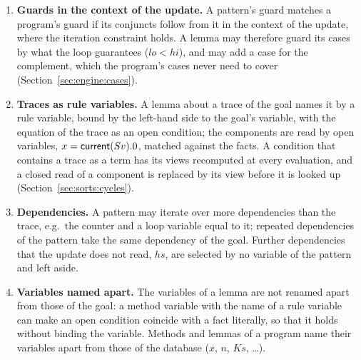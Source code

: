 \begin{enumerate}[nosep]
  the left-hand side by equations (Section~\ref{sec:sorts:selection}). A quantified hypothesis is never matched; the
  specification provides an atom for it.
\item \textbf{Guards in the context of the update.} A pattern's guard matches a program's guard if its conjuncts follow
  from it in the context of the update, where the iteration constraint holds. A lemma may therefore guard its cases by
  what the loop guarantees ($lo < hi$), and may add a case for the complement, which the program's cases never need to
  cover (Section~\ref{sec:engine:cases}).
\item \textbf{Traces as rule variables.} A lemma about a trace of the goal names it by a rule variable, bound by the
  left-hand side to the goal's variable, with the equation of the trace as an open condition; the components are read
  by open variables, $x = \mathsf{current}(Sv).0$, matched against the facts. A condition that contains a trace as a term has its
  views recomputed at every evaluation, and a closed read of a component is replaced by its view before it is looked up
  (Section~\ref{sec:sorts:cycles}).
\item \textbf{Dependencies.} A pattern may iterate over more dependencies than the trace, e.g.\ the counter and a loop
  variable equal to it; repeated dependencies of the pattern take the same dependency of the goal. Further
  dependencies that the update does not read, $hs$, are selected by no variable of the pattern and left aside.
\item \textbf{Variables named apart.} The variables of a lemma are not renamed apart from those of the goal: a method
  variable with the name of a rule variable can make an open condition coincide with a fact literally, so that it holds
  without binding the variable. Methods and lemmas of a program name their variables apart from those of the database
  ($x$, $n$, $Ks$, \ldots).
\end{enumerate}

